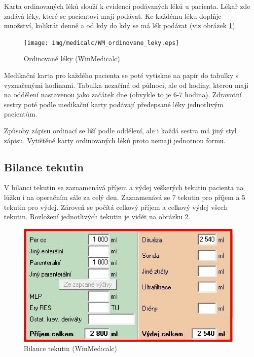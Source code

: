Karta ordinovaných léků slouží k evidenci podávaných léků u pacienta. Lékař zde zadává léky, které se pacientovi mají podávat. Ke každému léku doplňje množství, kolikrát denně a od kdy do kdy se má lék podávat (viz obrázek \ref{fig:WM_ordinovane_leky}).

\begin{figure}[H]
	\centering
	\texttt{[image: img/medicalc/WM\_ordinovane\_leky.eps]}
	\caption{Ordinované léky (WinMedicalc)}
  \label{fig:WM_ordinovane_leky}
\end{figure}

Medikační karta pro každého pacienta se poté vytiskne na papír do tabulky s vyznačenými hodinami. Tabulka nezačíná od půlnoci, ale od hodiny, kterou mají na oddělení nastavenou jako začátek dne (obvykle to je 6-7 hodina). Zdravotní sestry poté podle medikační karty podávají předepsané léky jednotlivým pacientům.

Způsoby zápisu ordinací se liší podle oddělení, ale i každá sestra má jiný styl zápisu. Vytištěné karty ordinovaných léků proto nemají jednotnou formu.

\subsection{Bilance tekutin}

V bilanci tekutin se zaznamenává příjem a výdej veškerých tekutin pacienta na lůžku i na operačním sále za celý den. Zaznamenává se 7 tekutin pro příjem a 5 tekutin pro výdej. Zároveň se počítá celkový příjem a celkový výdej všech tekutin. Rozložení jednotlivých tekutin je vidět na obrázku \ref{fig:WM_bilance_tekutin}.

\begin{figure}[H]
	\centering
	\includegraphics{img/medicalc/WM_bilance_tekutin.eps}
	\caption{Bilance tekutin (WinMedicalc)}
  \label{fig:WM_bilance_tekutin}
\end{figure}


